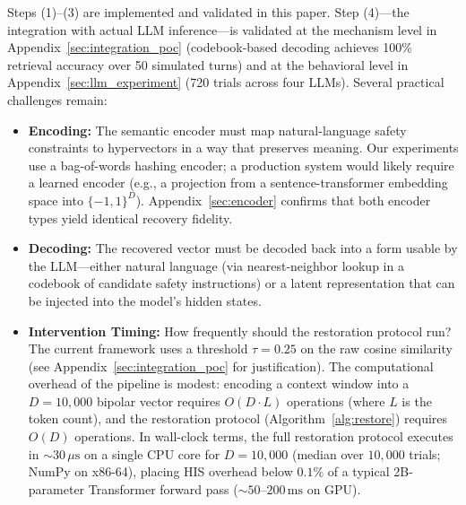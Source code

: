 \documentclass[a4paper,11pt]{article}
\begin{document}
Steps (1)--(3) are implemented and validated in this paper. Step (4)---the integration with actual LLM inference---is validated at the mechanism level in Appendix~\ref{sec:integration_poc} (codebook-based decoding achieves 100\% retrieval accuracy over 50 simulated turns) and at the behavioral level in Appendix~\ref{sec:llm_experiment} (720 trials across four LLMs). Several practical challenges remain:
\begin{itemize}
    \item \textbf{Encoding:} The semantic encoder must map natural-language safety constraints to hypervectors in a way that preserves meaning. Our experiments use a bag-of-words hashing encoder; a production system would likely require a learned encoder (e.g., a projection from a sentence-transformer embedding space into $\{-1,1\}^D$). Appendix~\ref{sec:encoder} confirms that both encoder types yield identical recovery fidelity.
    \item \textbf{Decoding:} The recovered vector must be decoded back into a form usable by the LLM---either natural language (via nearest-neighbor lookup in a codebook of candidate safety instructions) or a latent representation that can be injected into the model's hidden states.
    \item \textbf{Intervention Timing:} How frequently should the restoration protocol run? The current framework uses a threshold $\tau = 0.25$ on the raw cosine similarity (see Appendix~\ref{sec:integration_poc} for justification). The computational overhead of the pipeline is modest: encoding a context window into a $D = 10{,}000$ bipolar vector requires $O(D \cdot L)$ operations (where $L$ is the token count), and the restoration protocol (Algorithm~\ref{alg:restore}) requires $O(D)$ operations. In wall-clock terms, the full restoration protocol executes in ${\sim}30\,\mu\text{s}$ on a single CPU core for $D = 10{,}000$ (median over $10{,}000$ trials; NumPy on x86-64), placing HIS overhead below $0.1\%$ of a typical 2B-parameter Transformer forward pass (${\sim}50$--$200\,\text{ms}$ on GPU).
\end{itemize}
\end{document}
